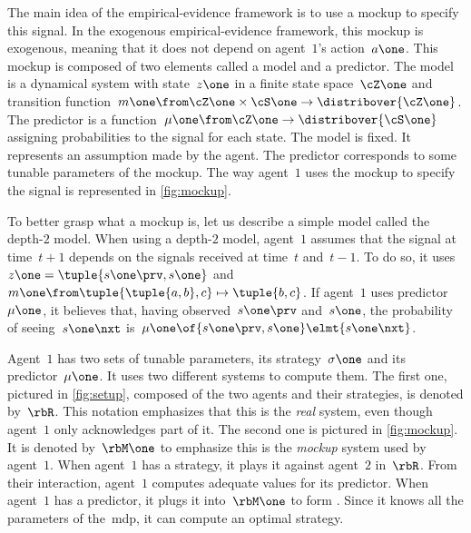 
The main idea of the empirical-evidence framework is to use a mockup to specify this signal.
In the exogenous empirical-evidence framework, this mockup is exogenous, meaning that it does not depend on agent~\(1\)'s action~\(a\one\).
This mockup is composed of two elements called a model and a predictor.
The model is a dynamical system with state~\(z\one\) in a finite state space~\(\cZ\one\) and transition function~\(m\one \from \cZ\one \times \cS\one \to \distribover{\cZ\one}\).
The predictor is a function~\(\mu\one \from \cZ\one \to \distribover{\cS\one}\) assigning probabilities to the signal for each state.
The model is fixed.
It represents an assumption made by the agent.
The predictor corresponds to some tunable parameters of the mockup.
The way agent~\(1\) uses the mockup to specify the signal is represented in \cref{fig:mockup}.


To better grasp what a mockup is, let us describe a simple model called the depth-\(2\) model.
When using a depth-\(2\) model, agent~\(1\) assumes that the signal at time~\(t+1\) depends on the signals received at time~\(t\) and~\(t-1\).
To do so, it uses~\(z\one = \tuple{s\one\prv, s\one}\) and~\(m\one \from \tuple{\tuple{a, b}, c} \mapsto \tuple{b, c}\).
If agent~\(1\) uses predictor~\(\mu\one\), it believes that, having observed~\(s\one\prv\) and~\(s\one\), the probability of seeing~\(s\one\nxt\) is~\(\mu\one \of{s\one\prv, s\one} \elmt{s\one\nxt}\).

Agent~\(1\) has two sets of tunable parameters, its strategy~\(\sigma\one\) and its predictor~\(\mu\one\).
It uses two different systems to compute them.
The first one, pictured in \cref{fig:setup}, composed of the two agents and their strategies, is denoted by~\(\rbR\).
This notation emphasizes that this is the \emph{real} system, even though agent~\(1\) only acknowledges part of it.
The second one is pictured in \cref{fig:mockup}.
It is denoted by~\(\rbM\one\) to emphasize this is the \emph{mockup} system used by agent~\(1\).
When agent~\(1\) has a strategy, it plays it against agent~\(2\) in~\(\rbR\).
From their interaction, agent~\(1\) computes adequate values for its predictor.
When agent~\(1\) has a predictor, it plugs it into~\(\rbM\one\) to form .
Since it knows all the parameters of the~\ac{mdp}, it can compute an optimal strategy.

